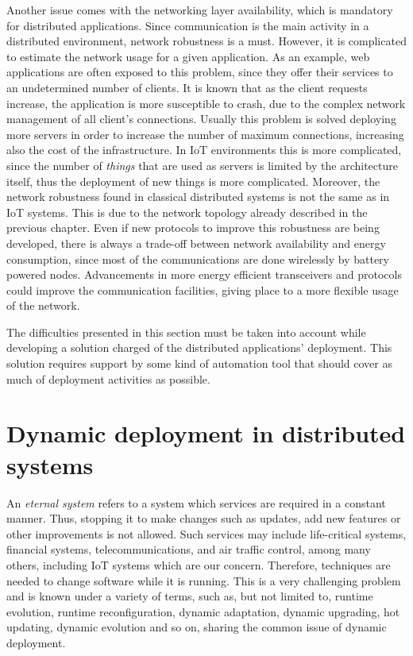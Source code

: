 Another issue comes with the networking layer availability, which is mandatory for distributed applications.
Since communication is the main activity in a distributed environment, network robustness is a must.
However, it is complicated to estimate the network usage for a given application.
As an example, web applications are often exposed to this problem, since they offer their services to an undetermined number of clients.
It is known that as the client requests increase, the application is more susceptible to crash, due to the complex network management of all client's connections.
Usually this problem is solved deploying more servers in order to increase the number of maximum connections, increasing also the cost of the infrastructure.
In IoT environments this is more complicated, since the number of \textit{things} that are used as servers is limited by the architecture itself, thus the deployment of new things is more complicated.
Moreover, the network robustness found in classical distributed systems is not the same as in IoT systems.
This is due to the network topology already described in the previous chapter.
Even if new protocols to improve this robustness are being developed\cite{thubert2013ietf}, there is always a trade-off between network availability and energy consumption, since most of the communications are done wirelessly by battery powered nodes.
Advancements in more energy efficient transceivers and protocols could improve the communication facilities, giving place to a more flexible usage of the network.

The difficulties presented in this section must be taken into account while developing a solution charged of the distributed applications' deployment.
This solution requires support by some kind of automation tool that should cover as much of deployment activities as possible. 

\section{Dynamic deployment in distributed systems}
An \textit{eternal system} refers to a system which services are required in a constant manner.
Thus, stopping it to make changes such as updates, add new features or other improvements is not allowed.
Such services may include life-critical systems, financial systems, telecommunications, and air traffic control, among many others, including IoT systems which are our concern.
Therefore, techniques are needed to change software while it is running. 
This is a very challenging problem and is known under a variety of terms, such as, but not limited to, runtime evolution, runtime reconfiguration, dynamic adaptation, dynamic upgrading, hot updating, dynamic evolution and so on, sharing the common issue of dynamic deployment.

